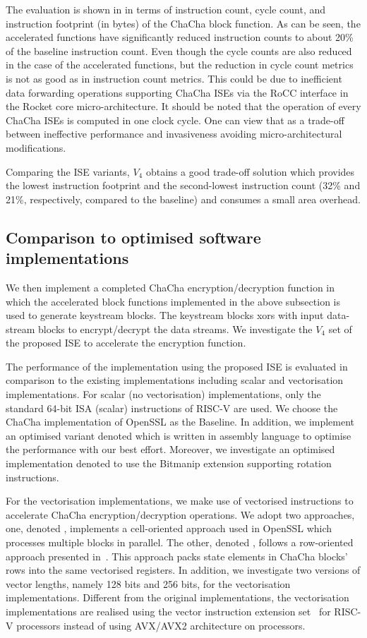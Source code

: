 The evaluation is shown in  in terms of instruction count, cycle count, and instruction footprint (in bytes) of the ChaCha block function. As can be seen, the accelerated functions have significantly reduced instruction counts to about 20\% of the baseline instruction count. Even though the cycle counts are also reduced in the case of the accelerated functions, but the reduction in cycle count metrics is not as good as in instruction count metrics. This could be due to inefficient data forwarding operations supporting ChaCha ISEs via the RoCC interface in the Rocket core micro-architecture. It should be noted that the operation of every ChaCha ISEs is computed in one clock cycle. One can view that as a trade-off between ineffective performance and invasiveness avoiding micro-architectural modifications.

Comparing the ISE variants, $V_4$ obtains a good trade-off solution which provides the lowest instruction footprint and the second-lowest instruction count (32\% and 21\%, respectively, compared to the baseline) and consumes a small area overhead.

\subsection{Comparison to optimised software implementations}
We then implement a completed ChaCha encryption/decryption function in which the accelerated block functions implemented in the above subsection is used to generate keystream blocks. The keystream blocks xors with input data-stream blocks to encrypt/decrypt the data streams. We investigate the $V_4$ set of the proposed ISE to accelerate the encryption function. 

The performance of the implementation using the proposed ISE is evaluated in comparison to the existing implementations including scalar and vectorisation implementations.  
For scalar (no vectorisation) implementations, only the standard 64-bit ISA (scalar) instructions of RISC-V are used. We choose the ChaCha implementation of OpenSSL as the Baseline. In addition, we implement an optimised variant denoted  which is written in assembly language to optimise the performance with our best effort. Moreover, we investigate an optimised implementation denoted  to use the Bitmanip extension supporting rotation instructions.

For the vectorisation implementations, we make use of vectorised instructions to accelerate ChaCha encryption/decryption operations. 
We adopt two approaches, one, denoted , implements a cell-oriented approach used in OpenSSL which processes multiple blocks in parallel.
The other, denoted , follows a row-oriented approach presented in~\cite{GolGue:14}. This approach packs state elements in ChaCha blocks' rows into the same vectorised registers.
In addition, we investigate two versions of vector lengths, namely 128 bits and 256 bits, for the vectorisation implementations. 
Different from the original implementations, the vectorisation implementations are realised using the vector instruction extension set~\cite{riscv:ext:vector:draft} for RISC-V processors instead of using AVX/AVX2 architecture on  processors.

